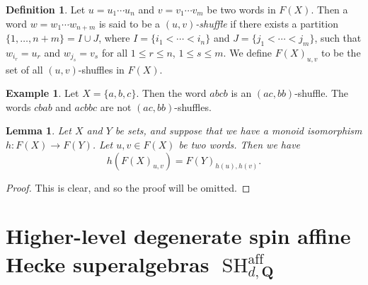 \documentclass[11pt]{amsart}
\newtheorem{lem}[theo]{Lemma}
\theoremstyle{definition}
\newtheorem{defn}[theo]{Definition}
\newtheorem{egg}[theo]{Example}
\numberwithin{equation}{section}
\begin{document}
\begin{defn} \label{snowing}
Let $ u = u_{1} \cdots u_{n} $ and $ v = v_{1} \cdots v_{m} $ be two words in $ F(X) $. Then a word $ w = w_1 \cdots w_{n+m} $ is said to be a \emph{$(u,v)$-shuffle} if there exists a partition $ \{1,\ldots,n+m\} = I \cup J $, where $ I = \{ i_{1} < \cdots < i_{n}\} $ and $ J = \{j_{1} < \cdots < j_{m}\} $, such that $ w_{i_{r}} = u_{r} $ and $w _{j_{s}} = v_{s} $ for all $ 1 \leq r \leq n $, $ 1 \leq s \leq m $. We define $ F(X)_{u,v} $ to be the set of all $ (u,v) $-shuffles in $ F(X) $.
\end{defn}

\begin{egg}
Let $ X = \{a,b,c\} $. Then the word $ abcb $ is an $ (ac,bb) $-shuffle. The words $ cbab $ and $ acbbc $ are not $ (ac,bb) $-shuffles.
\end{egg}



\begin{lem} \label{pencil_sharp_2}
Let $ X $ and $ Y $ be sets, and suppose that we have a monoid isomorphism $ h \colon F(X) \rightarrow F(Y) $. Let $ u,v \in F(X) $ be two words. Then we have
\begin{equation*} 
h(F(X)_{u,v}) = F(Y)_{h(u),h(v)}.
\end{equation*}
\end{lem}

\begin{proof}
This is clear, and so the proof will be omitted.
\end{proof}





\section{Higher-level degenerate spin affine Hecke superalgebras $ \operatorname{SH}_{d,\mathbf{Q}}^{\operatorname{aff}} $} \label{HLDSAHA_Section}
\end{document}
